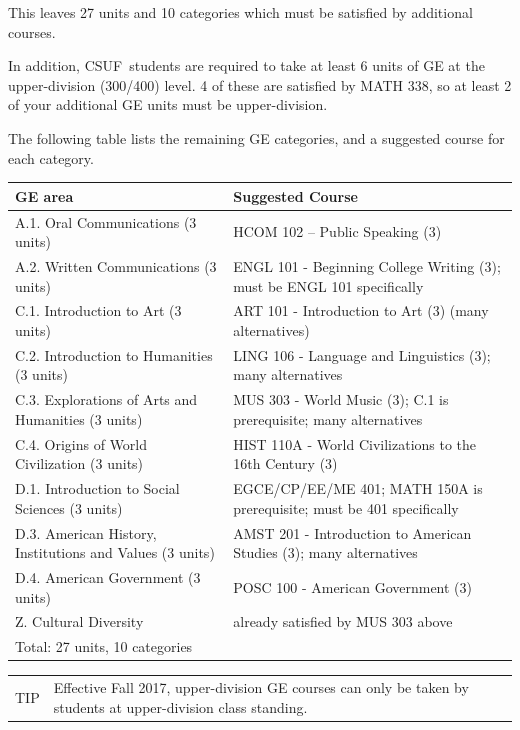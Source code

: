\documentclass{book}
\newenvironment{tip}{
  \tcolorbox \begin{tabular}{m{.5in} m{5.25in}}
    \Large{TIP} &
}{
  \end{tabular} \endtcolorbox
}
\newcommand{\CampusName}{CSUF}
\begin{document}
This leaves 27 units and 10 categories which must be satisfied by additional courses.

In addition, \CampusName~students are required to take at least 6 units of GE at the upper-division (300/400) level. 4 of these are satisfied by MATH 338, so at least 2 of your additional GE units must be upper-division.

The following table lists the remaining GE categories, and a suggested course for each category.

\begin{center}
\begin{tabular}{| p{3in} | p{3in} |} \hline
  \textbf{GE area} & \textbf{Suggested Course} \\ \hline
  A.1. Oral Communications (3 units) & HCOM 102 – Public Speaking (3) \\ \hline
  A.2. Written Communications (3 units) & ENGL 101 - Beginning College Writing (3); must be ENGL 101 specifically \\ \hline
  C.1. Introduction to Art (3 units) & ART 101 - Introduction to Art (3) (many alternatives) \\ \hline
  C.2. Introduction to Humanities (3 units) & LING 106 - Language and Linguistics (3); many alternatives \\ \hline
  C.3. Explorations of Arts and Humanities (3 units) & MUS 303 - World Music (3); C.1 is prerequisite; many alternatives \\ \hline
  C.4. Origins of World Civilization (3 units) & HIST 110A - World Civilizations to the 16th Century (3) \\ \hline
  D.1. Introduction to Social Sciences (3 units) & EGCE/CP/EE/ME 401; MATH 150A is prerequisite; must be 401 specifically \\ \hline
  D.3. American History, Institutions and Values (3 units) & AMST 201 - Introduction to American Studies (3); many alternatives \\ \hline
  D.4. American Government (3 units) & POSC 100 - American Government (3) \\ \hline
  Z. Cultural Diversity & already satisfied by MUS 303 above \\ \hline
  \multicolumn{2}{|l|}{Total: 27 units, 10 categories} \\ \hline
\end{tabular}
\end{center}

\begin{tip}
Effective Fall 2017, upper-division GE courses can only be taken by students at
upper-division class standing.
\end{tip}
\end{document}

